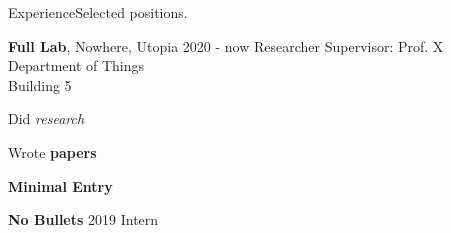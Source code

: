 \documentclass{resume}
\begin{document}
    \begin{rSection}{Experience}Selected positions.\par
    
    \begin{rSubsection}
    {\textbf{Full Lab}, Nowhere, Utopia}
    { 2020 - now }
    { Researcher }
    {Supervisor: Prof. X}
    {Department of Things\\Building 5}\item Did \textit{research}\item Wrote \textbf{papers}
    \end{rSubsection}
    
    \begin{rSubsection}
    {\textbf{Minimal Entry}}
    {  }
    {  }
    {}
    {} 
        \item[]\vspace{-2em}\end{rSubsection}
    
    \begin{rSubsection}
    {\textbf{No Bullets}}
    { 2019 }
    { Intern }
    {}
    {} 
        \item[]\vspace{-2em}\end{rSubsection}
    
    \end{rSection}

    
\end{document}
